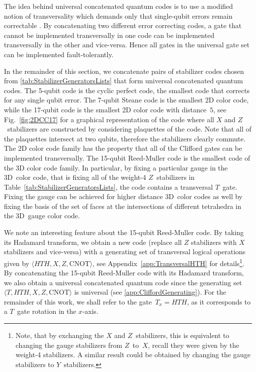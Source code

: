 \documentclass[pra,longbibliography,twocolumn,showpacs,nofootinbib,superscriptaddress,notitlepage]{revtex4-1}
\begin{document}
The idea behind universal concatenated quantum codes is to use a modified notion of transversality which demands only that single-qubit errors remain correctable \cite{JL14}. By concatenating two different error correcting codes, a gate that cannot be implemented transversally in one code can be implemented transversally in the other and vice-versa. Hence all gates in the universal gate set can be implemented fault-tolerantly.

In the remainder of this section, we concatenate pairs of stabilizer codes chosen from \cref{tab:StabilizerGeneratorsLists} that form universal concatenated quantum codes. The 5-qubit code is the cyclic perfect code, the smallest code that corrects for any single qubit error. The 7-qubit Steane code is the smallest 2D color code, while the 17-qubit code is the smallest 2D color code with distance~$5$, see Fig.~\ref{fig:2DCC17} for a graphical representation of the code where all $X$ and $Z$~stabilizers are constructed by considering plaquettes of the code. Note that all of the plaquettes intersect at two qubits, therefore the stabilizers clearly commute. The 2D color code family has the property that all of the Clifford gates can be implemented transversally. The 15-qubit Reed-Muller code is the smallest code of the 3D color code family. In particular, by fixing a particular gauge in the 3D~color code, that is fixing all of the weight-4 $Z$~stabilizers in Table~\ref{tab:StabilizerGeneratorsLists}, the code contains a transversal $T$~gate. Fixing the gauge can be achieved for higher distance 3D~color codes as well by fixing the basis of the set of faces at the intersections of different tetrahedra in the 3D~gauge color code.

We note an interesting feature about the 15-qubit Reed-Muller code. By taking its Hadamard transform, we obtain a new code (replace all $Z$ stabilizers with $X$ stabilizers and vice-versa) with a generating set of transversal logical operations given by $\langle HTH, X,Z, \text{CNOT} \rangle$, see Appendix~\ref{app:TransversalHTH} for details\footnote{Note, that by exchanging the $X$ and $Z$~stabilizers, this is equivalent to changing the gauge stabilizers from $Z$~to~$X$, recall they were given by the weight-4 stabilizers. A similar result could be obtained by changing the gauge stabilizers to $Y$~stabilizers.}. By concatenating the 15-qubit Reed-Muller code with its Hadamard transform, we also obtain a universal concatenated quantum code since the generating set $\langle T, HTH, X, Z, \text{CNOT} \rangle$ is universal (see \cref{app:CliffordGenerating}). For the remainder of this work, we shall refer to the gate~$T_x = HTH$, as it corresponds to a $T$~gate rotation in the $x$-axis.
\end{document}
